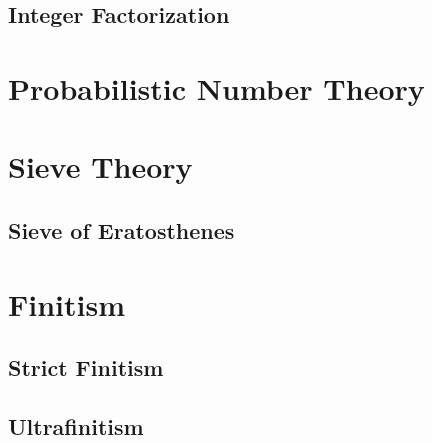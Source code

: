 \subsection{Integer Factorization}\label{sec:integer_factorization}



\section{Probabilistic Number Theory}\label{sec:probabilistic_number_theory}

\section{Sieve Theory}\label{sec:sieve_theory}

\subsection{Sieve of Eratosthenes}\label{sec:sieve}



\section{Finitism}\label{sec:finitism}

\subsection{Strict Finitism}\label{sec:strict_finitism}

\subsection{Ultrafinitism}\label{sec:ultrafinitism}
